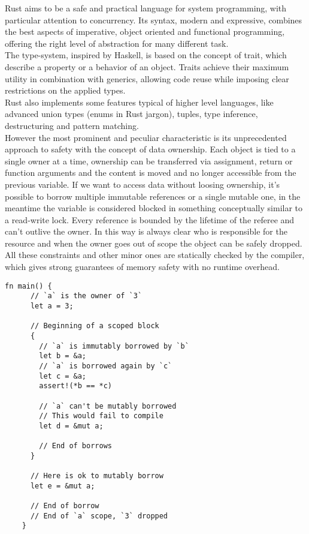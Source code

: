 Rust aims to be a safe and practical language for system programming, with particular attention to concurrency. Its syntax, modern and expressive, combines the best aspects of imperative, object oriented and functional programming, offering the right level of abstraction for many different task.\\
The type-system, inspired by Haskell, is based on the concept of trait, which describe a property or a behavior of an object. Traits achieve their maximum utility in combination with generics, allowing code reuse while imposing clear restrictions on the applied types.\\
Rust also implements some features typical of higher level languages, like advanced union types (enums in Rust jargon), tuples, type inference, destructuring and pattern matching.\\
However the most prominent and peculiar characteristic is its unprecedented approach to safety with the concept of data ownership. Each object is tied to a single owner at a time, ownership can be transferred via assignment, return or function arguments and the content is moved and no longer accessible from the previous variable. If we want to access data without loosing ownership, it's possible to borrow multiple immutable references or a single mutable one, in the meantime the variable is considered blocked in something conceptually similar to a read-write lock. Every reference is bounded by the lifetime of the referee and can't outlive the owner. In this way is always clear who is responsible for the resource and when the owner goes out of scope the object can be safely dropped.\\
All these constraints and other minor ones are statically checked by the compiler, which gives strong guarantees of memory safety with no runtime overhead.

\begin{minipage}{\textwidth}
\begin{lstlisting}[caption={Example of borrow},label={lst:borrow}]
    fn main() {
      // `a` is the owner of `3`
      let a = 3;

      // Beginning of a scoped block
      {
        // `a` is immutably borrowed by `b`
        let b = &a;
        // `a` is borrowed again by `c`
        let c = &a;
        assert!(*b == *c)

        // `a` can't be mutably borrowed
        // This would fail to compile
        let d = &mut a;

        // End of borrows
      }

      // Here is ok to mutably borrow
      let e = &mut a;

      // End of borrow
      // End of `a` scope, `3` dropped
    }
\end{lstlisting}
\end{minipage}\\

